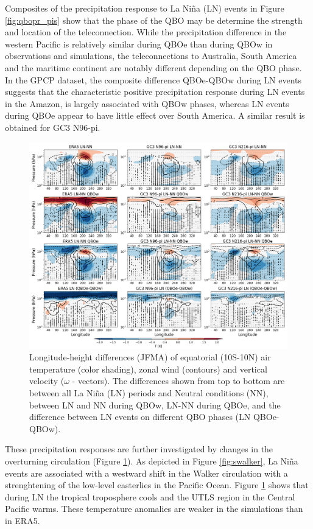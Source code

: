 Composites of the precipitation response to La Niña (LN) events in Figure \ref{fig:qbopr_pis} show that the phase of the QBO may be determine the strength and location of the teleconnection. 
While the precipitation difference in the western Pacific is relatively similar during QBOe than during QBOw in observations and simulations, the teleconnections to Australia, South America and the maritime continent are notably different depending on the QBO phase. 
In the GPCP dataset, the composite difference QBOe-QBOw during LN events suggests that the characteristic positive precipitation response during LN events in the Amazon, is largely associated with QBOw phases, whereas LN events during QBOe appear to have little effect over South America. 
A similar result is obtained for GC3 N96-pi. 


\begin{figure}[t!]
\includegraphics[width=\linewidth]{figures/walker_wqbo_jfma}
\caption{Longitude-height differences (JFMA) of equatorial (10S-10N) air temperature (color shading), zonal wind (contours) and vertical velocity ($\omega$ - vectors). The differences shown from top to bottom are between all La Niña (LN) periods and Neutral conditions (NN), between LN and NN during QBOw, LN-NN during QBOe, and the difference between LN events on different QBO phases (LN QBOe-QBOw). 
}
\label{fig:qbowalker_pis}
\end{figure}

These precipitation responses are further investigated by changes in the overturning circulation (Figure \ref{fig:qbowalker_pis}). As depicted in Figure \ref{fig:swalker}, La Niña events are associated with a westward shift in the Walker circulation with a strenghtening of the low-level easterlies in the Pacific Ocean. 
Figure \ref{fig:qbowalker_pis} shows that during LN the tropical troposphere cools and the UTLS region in the Central Pacific warms. These temperature anomalies are weaker in the simulations than in ERA5. 

